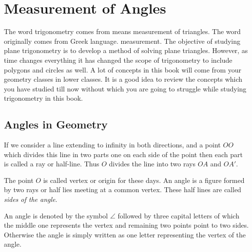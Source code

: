 \chapter{Measurement of Angles}
The word trigonometry comes from means measurement of triangles. The word originally comes from Greek language.
measurement. The objective of studying plane trigonometry is to develop a method of solving plane triangles. However, as time
changes everything it has changed the scope of trigonometry to include polygons and circles as well. A lot of concepts in this book
will come from your geometry classes in lower classes. It is a good idea to review the concepts which you have studied till now
without which you are going to struggle while studying trigonometry in this book.

\section{Angles in Geometry}
If we consider a line extending to infinity in both directions, and a point $OO$ which divides this line in two parts one on each
side of the point then each part is called a ray or half-line. Thus $O$ divides the line into two rays $OA$ and $OA'$.

\begin{center}
\end{center}

The point $O$ is called vertex or origin for these days. An angle is a figure formed by two rays or half lies meeting at a common
vertex. These half lines are called {\it sides of the angle}.

An angle is denoted by the symbol $\angle$ followed by three capital letters of which the middle one represents the vertex and
remaining two points point to two sides. Otherwise the angle is simply written as one letter representing the vertex of the
angle.

\begin{center}
\end{center}



